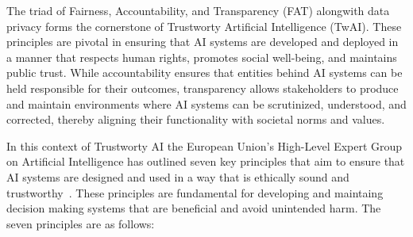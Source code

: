 The triad of Fairness, Accountability, and Transparency (FAT) alongwith data privacy forms the cornerstone of Trustworty Artificial Intelligence (TwAI). These principles are pivotal in ensuring that AI systems are developed and deployed in a manner that respects human rights, promotes social well-being, and maintains public trust. While accountability ensures that entities behind AI systems can be held responsible for their outcomes, transparency allows stakeholders to produce and maintain environments where AI systems can be scrutinized, understood, and corrected, thereby aligning their functionality with societal norms and values.

In this context of Trustworty AI the European Union's High-Level Expert Group on Artificial Intelligence has outlined seven key principles that aim to ensure that AI systems are designed and used in a way that is ethically sound and trustworthy~\citep{TwAI_Europe}. These principles are fundamental for developing and maintaing decision making systems that are beneficial and avoid unintended harm. The seven principles are as follows:

